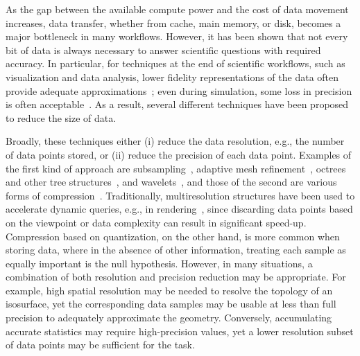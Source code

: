 As the gap between the available compute power and the cost of data movement increases, data
transfer, whether from cache, main memory, or disk, becomes a major bottleneck in many workflows.
However, it has been shown that not every bit of data is always necessary to answer scientific
questions with required accuracy. In particular, for techniques at the end of scientific workflows,
such as visualization and data analysis, lower fidelity representations of the data often provide
adequate approximations~\cite{woodring2011,covra2012,compression_sim2013}; even during
simulation, some loss in precision is often
acceptable~\cite{compression_sim2013,doi:10.1177/1094342018762036}. As a result, several different
techniques have been proposed to reduce the size of data. 

Broadly, these techniques either (i) reduce the data resolution, e.g., the number of data points
stored, or (ii) reduce the precision of each data point. Examples of the first kind of approach are
subsampling~\cite{idx2001}, adaptive mesh refinement~\cite{amr1989}, octrees and other tree
structures~\cite{hierarchical1984}, and wavelets~\cite{woodring2011}, and those of the second are
various forms of compression~\cite{fpzip,isabela,zfp2014,sz,vq1992,compression_domain2003,sqe}.
Traditionally, multiresolution structures have been used to accelerate dynamic queries, e.g., in
rendering~\cite{multires_octree1999}, since discarding data points based on the viewpoint or data
complexity can result in significant speed-up. Compression based on quantization, on the other hand,
is more common when storing data, where in the absence of other information, treating each sample as
equally important is the null hypothesis. However, in many situations, a combination of both
resolution and precision reduction may be appropriate. For example, high spatial resolution may be
needed to resolve the topology of an isosurface, yet the corresponding data samples may be usable at
less than full precision to adequately approximate the geometry. Conversely, accumulating accurate
statistics may require high-precision values, yet a lower resolution subset of data points may be
sufficient for the task.

